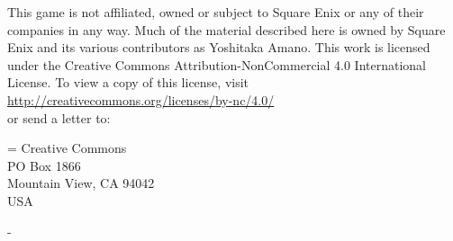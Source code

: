 \begin{multicols}{2}
This game is not affiliated, owned or subject to Square Enix or any of their companies in any way. Much of the material described here is owned by Square Enix and its various contributors as Yoshitaka Amano. This work is licensed under the Creative Commons Attribution-NonCommercial 4.0 International License. To view a copy of this license, visit\\
\url{http://creativecommons.org/licenses/by-nc/4.0/}\\
or send a letter to:

\hangindent=\parindent%
Creative Commons\\
PO Box 1866\\
Mountain View, CA 94042\\
USA

\begin{center}
- \ferrum%
\end{center}

\end{multicols}
\newpage

